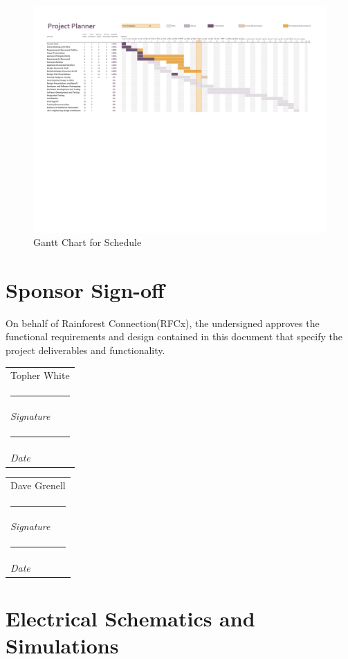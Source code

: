 \documentclass{article}
\makeatletter
\numberwithin{figure}{section}
\numberwithin{equation}{section}
\let\oldappendix\appendix %
\renewcommand\appendix{%
    \oldappendix
    \newcommand{\section@cntformat}{\appendixname~\thesection\quad}
}
\newcommand{\namesigdate}[2][5cm]{%
  \begin{tabular}{@{}p{#1}@{}}
    #2 \\[2\normalbaselineskip] \hrule \\[0pt]
    {\small \textit{Signature}} \\[2\normalbaselineskip] \hrule \\[0pt]
    {\small \textit{Date}}
  \end{tabular}
}
\makeatother
\begin{document}
{\begin{landscape}
\begin{figure}[H]
  \centering
  \includegraphics[scale=0.85, trim=0cm 12cm 0cm 0cm, clip=true]{Schedule.pdf}
  \caption{Gantt Chart for Schedule}
  \label{fig:gantt}
\end{figure}
\end{landscape}

\newpage
\section{Sponsor Sign-off}
On behalf of Rainforest Connection(RFCx), the undersigned  approves the functional requirements and design contained in this document that specify the project deliverables and functionality.

\bigskip

\bigskip
\noindent \namesigdate{Topher White} \hfill \namesigdate{Dave Grenell}


\newpage
\vspace*{\fill}
\section*{}
\vspace*{\fill}
\newpage
\appendix
\section{Electrical Schematics and Simulations} \label{sect:appendixA}

}
\end{document}
